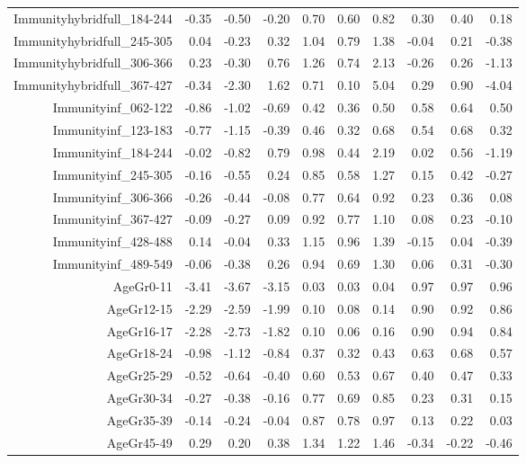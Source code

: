 \begin{table}[ht]
\begin{tabular}{rrrrrrrrrr}
  Immunityhybridfull\_184-244 & -0.35 & -0.50 & -0.20 & 0.70 & 0.60 & 0.82 & 0.30 & 0.40 & 0.18 \\ 
  Immunityhybridfull\_245-305 & 0.04 & -0.23 & 0.32 & 1.04 & 0.79 & 1.38 & -0.04 & 0.21 & -0.38 \\ 
  Immunityhybridfull\_306-366 & 0.23 & -0.30 & 0.76 & 1.26 & 0.74 & 2.13 & -0.26 & 0.26 & -1.13 \\ 
  Immunityhybridfull\_367-427 & -0.34 & -2.30 & 1.62 & 0.71 & 0.10 & 5.04 & 0.29 & 0.90 & -4.04 \\ 
  Immunityinf\_062-122 & -0.86 & -1.02 & -0.69 & 0.42 & 0.36 & 0.50 & 0.58 & 0.64 & 0.50 \\ 
  Immunityinf\_123-183 & -0.77 & -1.15 & -0.39 & 0.46 & 0.32 & 0.68 & 0.54 & 0.68 & 0.32 \\ 
  Immunityinf\_184-244 & -0.02 & -0.82 & 0.79 & 0.98 & 0.44 & 2.19 & 0.02 & 0.56 & -1.19 \\ 
  Immunityinf\_245-305 & -0.16 & -0.55 & 0.24 & 0.85 & 0.58 & 1.27 & 0.15 & 0.42 & -0.27 \\ 
  Immunityinf\_306-366 & -0.26 & -0.44 & -0.08 & 0.77 & 0.64 & 0.92 & 0.23 & 0.36 & 0.08 \\ 
  Immunityinf\_367-427 & -0.09 & -0.27 & 0.09 & 0.92 & 0.77 & 1.10 & 0.08 & 0.23 & -0.10 \\ 
  Immunityinf\_428-488 & 0.14 & -0.04 & 0.33 & 1.15 & 0.96 & 1.39 & -0.15 & 0.04 & -0.39 \\ 
  Immunityinf\_489-549 & -0.06 & -0.38 & 0.26 & 0.94 & 0.69 & 1.30 & 0.06 & 0.31 & -0.30 \\ 
  AgeGr0-11 & -3.41 & -3.67 & -3.15 & 0.03 & 0.03 & 0.04 & 0.97 & 0.97 & 0.96 \\ 
  AgeGr12-15 & -2.29 & -2.59 & -1.99 & 0.10 & 0.08 & 0.14 & 0.90 & 0.92 & 0.86 \\ 
  AgeGr16-17 & -2.28 & -2.73 & -1.82 & 0.10 & 0.06 & 0.16 & 0.90 & 0.94 & 0.84 \\ 
  AgeGr18-24 & -0.98 & -1.12 & -0.84 & 0.37 & 0.32 & 0.43 & 0.63 & 0.68 & 0.57 \\ 
  AgeGr25-29 & -0.52 & -0.64 & -0.40 & 0.60 & 0.53 & 0.67 & 0.40 & 0.47 & 0.33 \\ 
  AgeGr30-34 & -0.27 & -0.38 & -0.16 & 0.77 & 0.69 & 0.85 & 0.23 & 0.31 & 0.15 \\ 
  AgeGr35-39 & -0.14 & -0.24 & -0.04 & 0.87 & 0.78 & 0.97 & 0.13 & 0.22 & 0.03 \\ 
  AgeGr45-49 & 0.29 & 0.20 & 0.38 & 1.34 & 1.22 & 1.46 & -0.34 & -0.22 & -0.46 \\ 

\end{tabular}
\end{table}
